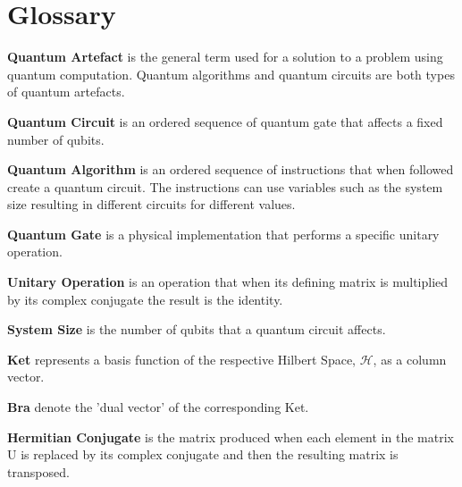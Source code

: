 \chapter{Glossary}
\noindent\textbf{Quantum Artefact} is the general term used for a solution to a problem using quantum computation.
Quantum algorithms and quantum circuits are both types of quantum artefacts.

\noindent\textbf{Quantum Circuit} is an ordered sequence of quantum gate that affects a fixed number of qubits.

\noindent\textbf{Quantum Algorithm} is an ordered sequence of instructions that when followed create a quantum circuit.
The instructions can use variables such as the system size resulting in different circuits for different values.

\noindent\textbf{Quantum Gate} is a physical implementation that performs a specific unitary operation.

\noindent\textbf{Unitary Operation} is an operation that when its defining matrix is multiplied by its complex conjugate the result is the identity.

\noindent\textbf{System Size} is the number of qubits that a quantum circuit affects.

\noindent\textbf{Ket} represents a basis function of the respective Hilbert Space, $\mathcal{H}$, as a column vector.

\noindent\textbf{Bra} denote the 'dual vector' of the corresponding Ket.


\noindent\textbf{Hermitian Conjugate} is the matrix produced when each element in the matrix U is replaced by its complex conjugate and then the resulting matrix is transposed.